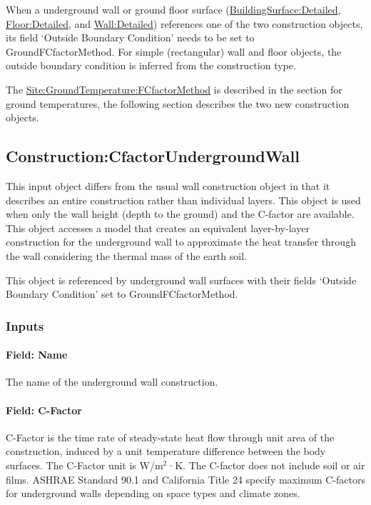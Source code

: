 When a underground wall or ground floor surface (\hyperref[buildingsurfacedetailed]{BuildingSurface:Detailed}, \hyperref[floordetailed]{Floor:Detailed}, and \hyperref[walldetailed]{Wall:Detailed}) references one of the two construction objects, its field `Outside Boundary Condition' needs to be set to GroundFCfactorMethod. For simple (rectangular) wall and floor objects, the outside boundary condition is inferred from the construction type.

The \hyperref[sitegroundtemperaturefcfactormethod]{Site:GroundTemperature:FCfactorMethod} is described in the section for ground temperatures, the following section describes the two new construction objects.

\subsection{Construction:CfactorUndergroundWall}\label{constructioncfactorundergroundwall}

This input object differs from the usual wall construction object in that it describes an entire construction rather than individual layers. This object is used when only the wall height (depth to the ground) and the C-factor are available.~ This object accesses a model that creates an equivalent layer-by-layer construction for the underground wall to approximate the heat transfer through the wall considering the thermal mass of the earth soil.

This object is referenced by underground wall surfaces with their fields `Outside Boundary Condition' set to GroundFCfactorMethod.

\subsubsection{Inputs}\label{inputs-36}

\paragraph{Field: Name}\label{field-name-29-000}

The name of the underground wall construction.

\paragraph{Field: C-Factor}\label{field-c-factor}

C-Factor is the time rate of steady-state heat flow through unit area of the construction, induced by a unit temperature difference between the body surfaces. The C-Factor unit is W/m\(^{2}\)·K. The C-factor does not include soil or air films. ASHRAE Standard 90.1 and California Title 24 specify maximum C-factors for underground walls depending on space types and climate zones.

